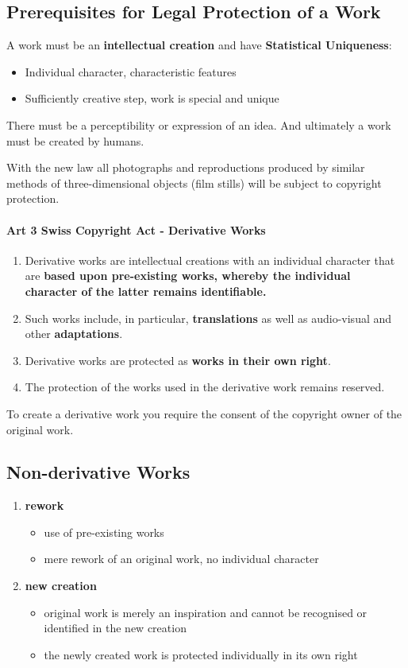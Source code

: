 \documentclass[11pt]{article}
\theoremstyle{definition}
\begin{document}
\subsection{Prerequisites for Legal Protection of a Work}
A work must be an \textbf{intellectual creation} and have \textbf{Statistical Uniqueness}:
\begin{itemize}
	\item Individual character, characteristic features
	\item Sufficiently creative step, work is special and unique
\end{itemize}

There must be a perceptibility or expression of an idea. And ultimately a work must be created by humans.

With the new law all photographs and reproductions produced by similar methods of three-dimensional objects (film stills) will be subject to copyright protection.

\paragraph{Art 3 Swiss Copyright Act - Derivative Works}
\begin{enumerate}[label=\arabic* ]
	\item Derivative works are intellectual creations with an individual character that are \textbf{based upon pre-existing works, whereby the individual character of the latter remains identifiable.}
	\item Such works include, in particular, \textbf{translations} as well as audio-visual and other \textbf{adaptations}.
	\item Derivative works are protected as \textbf{works in their own right}.
	\item The protection of the works used in the derivative work remains reserved.
\end{enumerate}

To create a derivative work you require the consent of the copyright owner of the original work.

\subsection{Non-derivative Works}
\begin{enumerate}[label=\arabic* ]
	\item \textbf{rework}
	\begin{itemize}
		\item use of pre-existing works
		\item mere rework of an original work, no individual character
	\end{itemize}
	\item \textbf{new creation}
	\begin{itemize}
		\item original work is merely an inspiration and cannot be recognised or identified in the new creation
		\item the newly created work is protected individually in its own right
	\end{itemize}
\end{enumerate}
\end{document}
